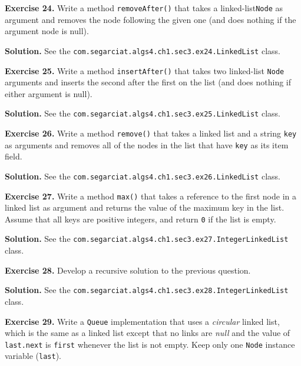 \documentclass[12pt, a4paper]{article}
\newenvironment{ex}[2][Exercise]
{\par\medskip\noindent \textbf{#1 #2.}}
{\medskip}
\newenvironment{sol}[1][Solution]
{\par\medskip\noindent \textbf{#1.} }
{\medskip}
\begin{document}
	\begin{ex}{24}
		Write a method \texttt{removeAfter()} that takes a linked-list\texttt{Node}
		as argument and removes the node following the given one (and does nothing if the
		argument node is null).
	\end{ex}
	\begin{sol}
		See the \texttt{com.segarciat.algs4.ch1.sec3.ex24.LinkedList} class.
	\end{sol}
	\begin{ex}{25}
		Write a method \texttt{insertAfter()} that takes two linked-list \texttt{Node}
		arguments and inserts the second after the first on the list  (and does nothing
		if either argument is null).
	\end{ex}
	\begin{sol}
		See the \texttt{com.segarciat.algs4.ch1.sec3.ex25.LinkedList} class.
	\end{sol}
	\begin{ex}{26}
		Write a method \texttt{remove()} that takes a linked list and a string \texttt{key}
		as arguments and removes all of the nodes in the list that have \texttt{key}
		as its item field.
	\end{ex}
	\begin{sol}
		See the \texttt{com.segarciat.algs4.ch1.sec3.ex26.LinkedList} class.
	\end{sol}
		\begin{ex}{27}
		Write a method \texttt{max()} that takes a reference to the first node in a linked
		list as argument and returns the value of the maximum key in the list. Assume
		that all keys are positive integers, and return \texttt{0} if the list is empty.
	\end{ex}
	\begin{sol}
		See the \texttt{com.segarciat.algs4.ch1.sec3.ex27.IntegerLinkedList} class.
	\end{sol}
	\begin{ex}{28}
		Develop a recursive solution to the previous question.
	\end{ex}
	\begin{sol}
		See the \texttt{com.segarciat.algs4.ch1.sec3.ex28.IntegerLinkedList} class.
	\end{sol}
	\begin{ex}{29}
		Write a \texttt{Queue} implementation that uses a \emph{circular} linked list, which
		is the same as a linked list except that no links are \emph{null} and the value
		of \texttt{last.next} is \texttt{first} whenever  the list is not empty. Keep
		only one \texttt{Node} instance variable (\texttt{last}).
	\end{ex}
\end{document}

